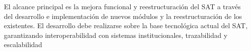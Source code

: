 El alcance principal es la mejora funcional y reestructuración del SAT a través del desarrollo e implementación de nuevos módulos y la reestructuración de los existentes. El desarrollo debe realizarse sobre la base tecnológica actual del SAT, garantizando interoperabilidad con sistemas institucionales, trazabilidad y escalabilidad